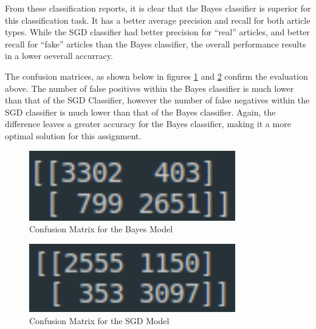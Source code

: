 From these classification reports, it is clear that the Bayes classifier is
superior for this classification task. It has a better average precision and
recall for both article types. While the SGD classifier had better precision for
``real'' articles, and better recall for ``fake'' articles than the Bayes
classifier, the overall performance results in a lower oeverall accurracy.

The confusion matrices, as shown below in figures \ref{fig:bayesConf} and
\ref{fig:sgdConf} confirm the evaluation above. The number of false positives
within the Bayes classifier is much lower than that of the SGD Classifier,
however the number of false negatives within the SGD classifier is much lower
than that of the Bayes classifier. Again, the difference leaves a greater
accuracy for the Bayes classifier, making it a more optimal solution for this
assignment.

\begin{figure}[H]
	\centering
	\includegraphics[width=0.8\textwidth]{images/bayesConfMatrix}
	\caption{Confusion Matrix for the Bayes Model}
	\label{fig:bayesConf}
\end{figure}


\begin{figure}[H]
	\centering
	\includegraphics[width=0.8\textwidth]{images/sgdConfMatrix}
	\caption{Confusion Matrix for the SGD Model}
	\label{fig:sgdConf}
\end{figure}
